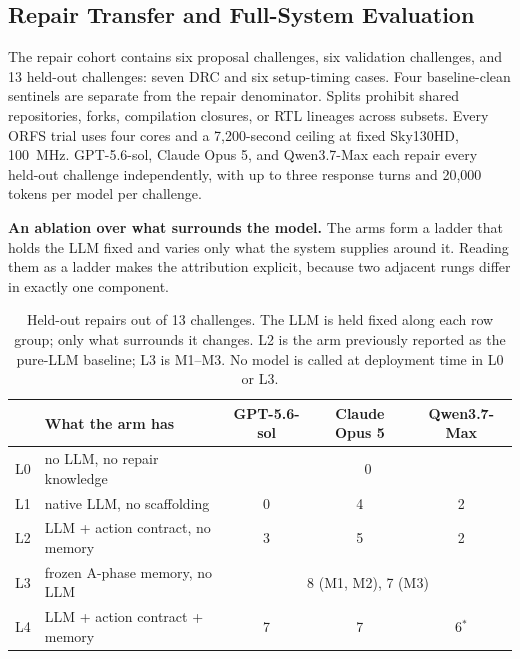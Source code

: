 %
%

\subsection{Repair Transfer and Full-System Evaluation}

The repair cohort contains six proposal challenges, six validation challenges,
and 13 held-out challenges: seven DRC and six setup-timing cases. Four
baseline-clean sentinels are separate from the repair denominator. Splits
prohibit shared repositories, forks, compilation closures, or RTL lineages
across subsets. Every ORFS trial uses four cores and a 7,200-second ceiling at
fixed Sky130HD, 100~MHz. GPT-5.6-sol, Claude Opus 5, and Qwen3.7-Max each repair
every held-out challenge independently, with up to three response turns and
20,000 tokens per model per challenge.

\textbf{An ablation over what surrounds the model.} The arms form a ladder that
holds the LLM fixed and varies only what the system supplies around it. Reading
them as a ladder makes the attribution explicit, because two adjacent rungs
differ in exactly one component.

\begin{table}[htbp]\centering
\caption{Held-out repairs out of 13 challenges. The LLM is held fixed along each
row group; only what surrounds it changes. L2 is the arm previously reported as
the pure-LLM baseline; L3 is M1--M3. No model is called at deployment time in L0
or L3.}
\label{tab:repair_ladder}
\small
\begin{tabular}{llccc}
\toprule
 & What the arm has & GPT-5.6-sol & Claude Opus 5 & Qwen3.7-Max \\
\midrule
L0 & no LLM, no repair knowledge & \multicolumn{3}{c}{0} \\
L1 & native LLM, no scaffolding & 0 & 4 & 2 \\
L2 & LLM + action contract, no memory & 3 & 5 & 2 \\
L3 & frozen A-phase memory, no LLM & \multicolumn{3}{c}{8 (M1, M2), 7 (M3)} \\
L4 & LLM + action contract + memory & 7 & 7 & 6$^{*}$ \\
\bottomrule
\end{tabular}
\end{table}

